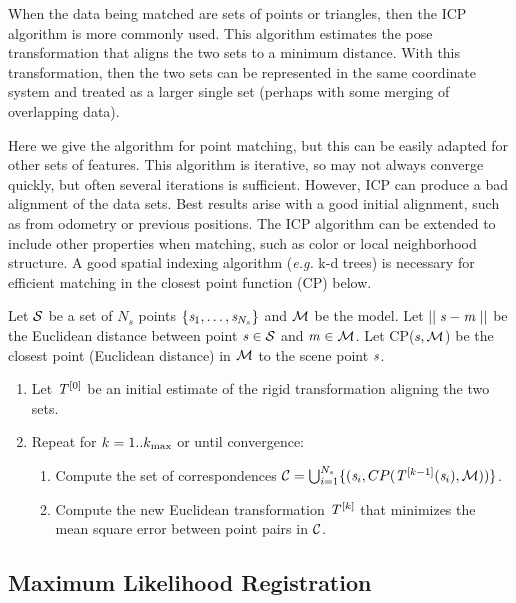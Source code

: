 \documentclass[twocolumn,oneside]{book}
\begin{document}
When the data being matched are sets of points or triangles,
then the ICP algorithm \cite{besl2} is more commonly used.
This algorithm estimates the pose transformation that aligns the
two sets to a minimum distance.
With this transformation, then the two sets can be represented in the
same coordinate system and treated as a larger single set (perhaps
with some merging of overlapping data).

Here we give the algorithm for point matching, but this can be
easily adapted for other sets of features.
This algorithm is iterative, so may not always converge quickly, but
often several iterations is sufficient.
However, ICP can produce a bad alignment of the data sets.
Best results arise with a good initial alignment, such as from
odometry or previous positions.
The ICP algorithm can be extended to include other properties when
matching, such as color or local neighborhood structure.
A good spatial indexing algorithm ({\it e.g.} k-d trees) 
is necessary for efficient matching
in the closest point function (CP) below.

Let ${\cal S}$ be a set of $N_s$ points $\{ {\bf \it s}_1, \dots, {\bf \it s}_{N_s} \}$
and ${\cal M}$ be the model.
Let $ \mid\mid {\bf \it s} - {\bf \it m} \mid\mid $ be the Euclidean distance
between point ${\bf \it s} \in {\cal S}$ and 
${\bf \it m} \in {\cal M}$.
Let CP(${\bf \it s},{\cal M}$) be the closest point (Euclidean distance)
in ${\cal M}$ to the scene point ${\bf \it s}$.
\begin{enumerate}
\item Let ${\bf \it T}^{[0]}$ be an initial estimate of the rigid transformation aligning the two sets.
\item Repeat for $k = 1 .. k_{\rm max}$ or until convergence:
\begin{enumerate}

\item Compute the set of correspondences 
${\cal C} = \bigcup_{i=1}^{N_s} \{ ( {\bf \it s}_i,
CP({\bf \it T}^{[k-1]}({\bf \it s}_i),{\cal M})) \}$.

\item Compute the new Euclidean transformation ${\bf \it T}^{[k]}$ that minimizes
the mean square error between point pairs in ${\cal C}$.

\end{enumerate}
\end{enumerate}


\subsection{Maximum Likelihood Registration} 
\end{document}
